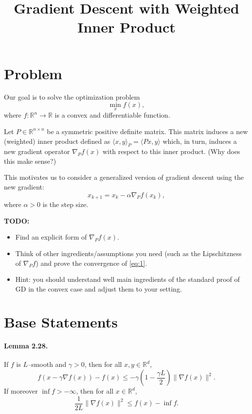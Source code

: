 \documentclass{article}
\title{Gradient Descent with Weighted Inner Product}
\date{}
\newcommand{\lr}[1]{\langle #1\rangle}
\newcommand{\R}{\mathbb{R}}
\begin{document}
\maketitle

\section*{Problem}

Our goal is to solve the optimization problem
\[
\min_x f(x),
\]
where \( f \colon \R^n \to \R \) is a convex and differentiable function.

Let \( P \in \R^{n \times n} \) be a symmetric positive definite matrix. This matrix induces a new (weighted) inner product defined as $\lr{x,y}_P = \lr{Px,y}$ 
which, in turn, induces a new gradient operator \( \nabla_P f(x) \) with respect to this inner product. (Why does this make sense?)

This motivates us to consider a generalized version of gradient descent using the new gradient:
\begin{equation}
\label{eq:1}
x_{k+1} = x_k - \alpha \nabla_P f(x_k),
\end{equation}
where \( \alpha > 0 \) is the step size.


\textbf{TODO:}
\begin{itemize}
\item Find an explicit form of \( \nabla_P f(x) \).
\item Think of other ingredients/assumptions you need (such as the Lipschitzness
  of \( \nabla_P f \)) and prove the convergence of \eqref{eq:1}.
\item Hint: you should understand well main ingredients of the standard
  proof of GD in the convex case and adjust them to your setting.
\end{itemize}

\section*{Base Statements}

\paragraph{Lemma 2.28.}
If $f$ is $L$–smooth and $\gamma > 0$, then for all $x, y \in \mathbb{R}^d$,
\[
f(x - \gamma \nabla f(x)) - f(x) \le -\gamma \left(1 - \frac{\gamma L}{2} \right) \|\nabla f(x)\|^2. \tag{10}
\]
If moreover $\inf f > -\infty$, then for all $x \in \mathbb{R}^d$,
\[
\frac{1}{2L} \|\nabla f(x)\|^2 \le f(x) - \inf f.
\]
\end{document}
